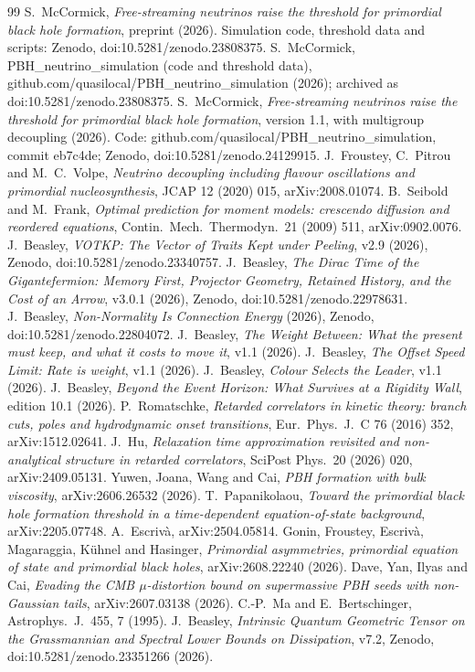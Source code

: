 \documentclass[11pt]{article}
\begin{document}
\begin{thebibliography}{99}
 S.~McCormick, \emph{Free-streaming neutrinos raise the threshold for primordial black hole formation}, preprint (2026). Simulation code, threshold data and scripts: Zenodo, doi:10.5281/zenodo.23808375.
 S.~McCormick, PBH\_neutrino\_simulation (code and threshold data), github.com/quasilocal/PBH\_neutrino\_simulation (2026); archived as doi:10.5281/zenodo.23808375.
 S.~McCormick, \emph{Free-streaming neutrinos raise the threshold for primordial black hole formation}, version 1.1, with multigroup decoupling (2026). Code: github.com/quasilocal/PBH\_neutrino\_simulation, commit eb7c4de; Zenodo, doi:10.5281/zenodo.24129915.
 J.~Froustey, C.~Pitrou and M.~C.~Volpe, \emph{Neutrino decoupling including flavour oscillations and primordial nucleosynthesis}, JCAP 12 (2020) 015, arXiv:2008.01074.
 B.~Seibold and M.~Frank, \emph{Optimal prediction for moment models: crescendo diffusion and reordered equations}, Contin.\ Mech.\ Thermodyn.\ 21 (2009) 511, arXiv:0902.0076.
 J.~Beasley, \emph{VOTKP: The Vector of Traits Kept under Peeling}, v2.9 (2026), Zenodo, doi:10.5281/zenodo.23340757.
 J.~Beasley, \emph{The Dirac Time of the Gigantefermion: Memory First, Projector Geometry, Retained History, and the Cost of an Arrow}, v3.0.1 (2026), Zenodo, doi:10.5281/zenodo.22978631.
 J.~Beasley, \emph{Non-Normality Is Connection Energy} (2026), Zenodo, doi:10.5281/zenodo.22804072.
 J.~Beasley, \emph{The Weight Between: What the present must keep, and what it costs to move it}, v1.1 (2026).
 J.~Beasley, \emph{The Offset Speed Limit: Rate is weight}, v1.1 (2026).
 J.~Beasley, \emph{Colour Selects the Leader}, v1.1 (2026).
 J.~Beasley, \emph{Beyond the Event Horizon: What Survives at a Rigidity Wall}, edition 10.1 (2026).
 P.~Romatschke, \emph{Retarded correlators in kinetic theory: branch cuts, poles and hydrodynamic onset transitions}, Eur.\ Phys.\ J.\ C 76 (2016) 352, arXiv:1512.02641.
 J.~Hu, \emph{Relaxation time approximation revisited and non-analytical structure in retarded correlators}, SciPost Phys.\ 20 (2026) 020, arXiv:2409.05131.
 Yuwen, Joana, Wang and Cai, \emph{PBH formation with bulk viscosity}, arXiv:2606.26532 (2026).
 T.~Papanikolaou, \emph{Toward the primordial black hole formation threshold in a time-dependent equation-of-state background}, arXiv:2205.07748.
 A.~Escriv\`a, arXiv:2504.05814.
 Gonin, Froustey, Escriv\`a, Magaraggia, K\"uhnel and Hasinger, \emph{Primordial asymmetries, primordial equation of state and primordial black holes}, arXiv:2608.22240 (2026).
 Dave, Yan, Ilyas and Cai, \emph{Evading the CMB $\mu$-distortion bound on supermassive PBH seeds with non-Gaussian tails}, arXiv:2607.03138 (2026).
 C.-P.~Ma and E.~Bertschinger, Astrophys.\ J.\ 455, 7 (1995).
 J.~Beasley, \emph{Intrinsic Quantum Geometric Tensor on the Grassmannian and Spectral Lower Bounds on Dissipation}, v7.2, Zenodo, doi:10.5281/zenodo.23351266 (2026).
\end{thebibliography}
\end{document}
